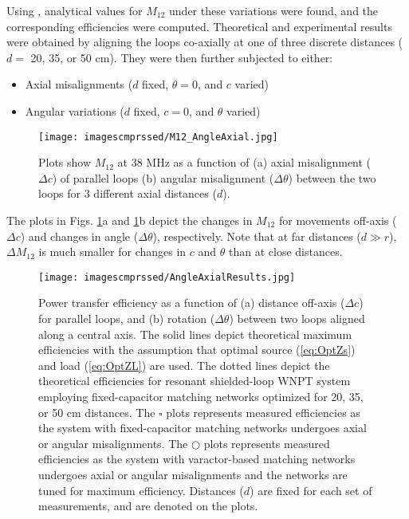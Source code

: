 \documentclass[journal]{IEEEtran}
\begin{document}
Using \cite{Grover, Mutual}, analytical values for $M_{12}$ under these variations were found, and the corresponding efficiencies were computed. Theoretical and experimental results were obtained by aligning the loops co-axially at one of three discrete distances ($d=$ 20, 35, or 50 cm). They were then further subjected to either:
\begin{itemize}
\item Axial misalignments ($d$ fixed, $\theta=0$, and $c$ varied)
\item Angular variations ($d$ fixed, $c=0$, and $\theta$ varied)
\end{itemize}
\begin{figure}[htbp]
    \centering
    \texttt{[image: imagescmprssed/M12\_AngleAxial.jpg]}
    \caption{Plots show $M_{12}$ at 38 MHz as a function of (a) axial misalignment ($\Delta c$) of parallel loops (b) angular misalignment ($\Delta \theta$) between the two loops for 3 different axial distances ($d$).}
    \label{fig:M12_AngleAxial}
\end{figure}

The plots in Figs. \ref{fig:M12_AngleAxial}a and \ref{fig:M12_AngleAxial}b depict the changes in $M_{12}$ for movements off-axis ($\Delta c$) and changes in angle ($\Delta \theta$), respectively. Note that at far distances ($d \gg r$), $\Delta M_{12}$ is much smaller for changes in $c$ and $\theta$ than at close distances.
\begin{figure}[htbp]
    \centering
    \texttt{[image: imagescmprssed/AngleAxialResults.jpg]}
    \caption{Power transfer efficiency as a function of (a) distance off-axis ($\Delta c$) for parallel loops, and (b) rotation ($\Delta \theta$) between two loops aligned along a central axis. The solid lines depict theoretical maximum efficiencies with the assumption that optimal source (\ref{eq:OptZs}) and load (\ref{eq:OptZL}) are used. The dotted lines depict the theoretical efficiencies for resonant shielded-loop WNPT system employing fixed-capacitor matching networks optimized for 20, 35, or 50 cm distances. The  $\square$ plots represents measured efficiencies as the system with fixed-capacitor matching networks undergoes axial or angular misalignments. The $\bigcirc$ plots represents measured efficiencies as the system with varactor-based matching networks undergoes axial or angular misalignments and the networks are tuned for maximum efficiency. Distances ($d$) are fixed for each set of measurements, and are denoted on the plots.}
    \label{fig:AngleAxialResults}
\end{figure}
\end{document}

